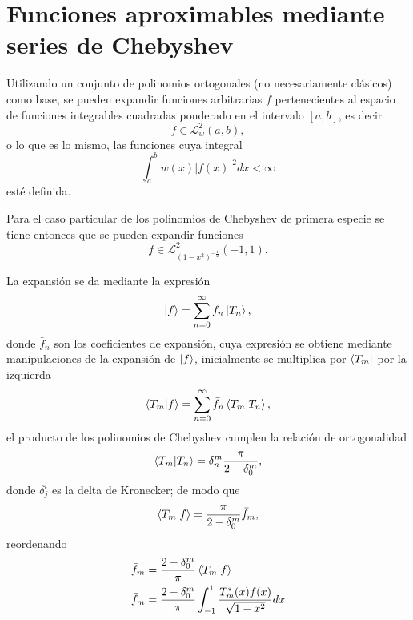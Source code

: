 \section[Aproximación polinomial]{Funciones aproximables mediante series de Chebyshev}
Utilizando un conjunto de polinomios ortogonales (no necesariamente clásicos) como base, se pueden
expandir funciones arbitrarias $f$ pertenecientes al espacio de 
funciones integrables cuadradas ponderado en el intervalo $[a, b]$, es decir 
\begin{equation*}f \in \mathcal{L}^2_w(a, b),\end{equation*}
o lo que es lo mismo, las funciones cuya integral 
\begin{equation*}\int_{a}^{b} w(x) |f(x)|^2 dx < \infty \end{equation*} esté definida.

Para el caso particular de los polinomios de Chebyshev de primera especie se tiene entonces que 
se pueden expandir funciones 
\begin{equation*}f \in \mathcal{L}^2_{(1-x^2)^{-\frac12}} (-1, 1) .\end{equation*}

La expansión se da mediante la expresión 
\begin{equation*}\label{eq:chebyshevSeries}
	\ket{f} = \sum_{n=0}^\infty \bar{f}_n \ket{T_n},
\end{equation*}
donde $\bar{f}_n$ son los coeficientes de expansión, cuya expresión se obtiene mediante manipulaciones
de la expansión de $\ket f$, inicialmente se multiplica por $\bra{T_m}$ por la izquierda
\begin{equation*}
	\bra{T_m}\ket{f} = \sum_{n=0}^\infty \bar{f}_n \bra{T_m}\ket{T_n},
\end{equation*}
el producto de los polinomios de Chebyshev cumplen la relación de ortogonalidad
\begin{equation*}
	\bra{T_m}\ket{T_n} = \delta^m_n\frac{\pi}{2 - \delta^m_0},
\end{equation*}
donde $\delta^i_j$ es la delta de Kronecker; de modo que
\begin{equation*}
	\bra{T_m}\ket{f} = \frac{\pi}{2 - \delta^m_0}\bar{f}_m,
\end{equation*}
reordenando
\begin{align}
	\bar{f}_m &= \frac{2 - \delta^m_0}{\pi} \bra{T_m}\ket{f} \nonumber\\
	\bar{f}_m &= \frac{2 - \delta^m_0}{\pi} \int_{-1}^{1} \frac{T_m^*(x)f(x)}{\sqrt{1-x^2}} dx
	 \label{eq:chebyshevCoeff}
\end{align}

